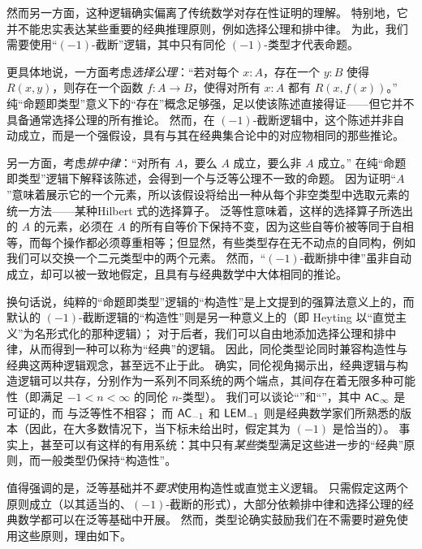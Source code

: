 然而另一方面，这种逻辑确实偏离了传统数学对存在性证明的理解。
特别地，它并不能忠实表达某些重要的经典推理原则，例如选择公理和排中律。
为此，我们需要使用“$(-1)$-截断”逻辑，其中只有同伦 $(-1)$-类型才代表命题。

%
更具体地说，一方面考虑\emph{选择公理}：“若对每个 $x: A$，存在一个 $y:B$ 使得 $R(x,y)$，则存在一个函数 $f : A\to B$，使得对所有 $x:A$ 都有 $R(x, f(x))$。”
纯“命题即类型”意义下的“存在”概念足够强，足以使该陈述直接得证——但它并不具备通常选择公理的所有推论。
然而，在 $(-1)$-截断逻辑中，这个陈述并非自动成立，而是一个强假设，具有与其在经典集合论中的对应物相同的那些推论。

%
%
另一方面，考虑\emph{排中律}：“对所有 $A$，要么 $A$ 成立，要么非 $A$ 成立。”
在纯“命题即类型”逻辑下解释该陈述，会得到一个与泛等公理不一致的命题。
因为证明“$A$”意味着展示它的一个元素，所以该假设将给出一种从每个非空类型中选取元素的统一方法——某种Hilbert 式的选择算子。
泛等性意味着，这样的选择算子所选出的 $A$ 的元素，必须在 $A$ 的所有自等价下保持不变，因为这些自等价被等同于自相等，而每个操作都必须尊重相等；但显然，有些类型存在无不动点的自同构，例如我们可以交换一个二元类型中的两个元素。
%
然而，“$(-1)$-截断排中律”虽非自动成立，却可以被一致地假定，且具有与经典数学中大体相同的推论。

换句话说，纯粹的``命题即类型''逻辑的``构造性''是上文提到的强算法意义上的，而默认的 $(-1)$-截断逻辑的``构造性''则是另一种意义上的（即 Heyting 以``直觉主义''为名形式化的那种逻辑）；
对于后者，我们可以自由地添加选择公理和排中律，从而得到一种可以称为``经典''的逻辑。
因此，同伦类型论同时兼容构造性与经典这两种逻辑观念，甚至远不止于此。
%
确实，同伦视角揭示出，经典逻辑与构造逻辑可以共存，分别作为一系列不同系统的两个端点，其间存在着无限多种可能性（即满足 $-1 < n < \infty$ 的同伦 $n$-类型）。
我们可以谈论``''和``''，其中 $\mathsf{AC}_{\infty}$ 是可证的，而 \LEM{\infty} 与泛等性不相容；
而 $\mathsf{AC}_{-1}$ 和 $\mathsf{LEM}_{-1}$ 则是经典数学家们所熟悉的版本（因此，在大多数情况下，当下标未给出时，假定其为 $(-1)$ 是恰当的）。
事实上，甚至可以有这样的有用系统：其中只有\emph{某些}类型满足这些进一步的``经典''原则，而一般类型仍保持``构造性''。%

值得强调的是，泛等基础并不\emph{要求}使用构造性或直觉主义逻辑。 %
只需假定这两个原则成立（以其适当的、$(-1)$-截断的形式），大部分依赖排中律和选择公理的经典数学都可以在泛等基础中开展。
然而，类型论确实鼓励我们在不需要时避免使用这些原则，理由如下。

